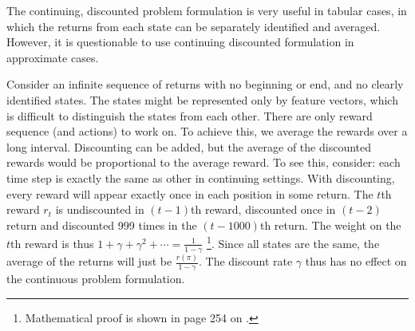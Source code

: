 \documentclass[lang=en,mode=normal,device=normal,color=blue,12pt]{elegantnote}
\DeclareMathOperator*{\1}{\mathbbm{1}}
\begin{document}
\begin{appendices}
The continuing, discounted problem formulation is very useful in tabular cases, in which the returns from each state can be separately identified and averaged. However, it is questionable to use continuing discounted formulation in approximate cases.

Consider an infinite sequence of returns with no beginning or end, and no clearly identified states. The states might be represented only by feature vectors, which is difficult to distinguish the states from each other. There are only reward sequence (and actions) to work on. To achieve this, we average the rewards over a long interval. Discounting can be added, but the average of the discounted rewards would be proportional to the average reward. To see this, consider:
each time step is exactly the same as other in continuing settings. With discounting, every reward will appear exactly once in each position in some return. The $t$th reward $r_t$ is undiscounted in $(t-1)$th reward, discounted once in $(t-2)$ return and discounted 999 times in the $(t-1000)$th return. The weight on the $t$th reward is thus $1+\gamma + \gamma^2 + \cdots = \frac{1}{1-\gamma}$ \footnote{Mathematical proof is shown in page 254 on \cite{Sutton1998}.}.
Since all states are the same, the average of the returns will just be $\frac{r(\pi)}{1-\gamma}$.
The discount rate $\gamma$ thus has no effect on the continuous problem formulation.

\end{appendices}



\newpage

\end{document}
